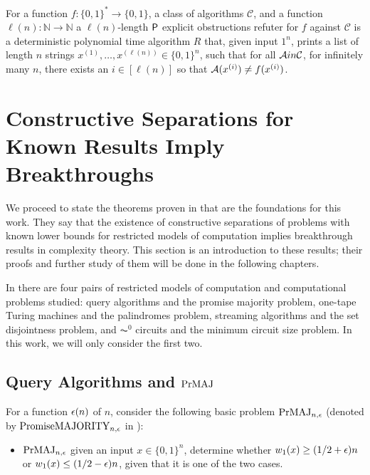 \begin{definition}
	For a function $f \colon \{0, 1\}^* \to \{0, 1\}$, a class of algorithms $\mathcal{C}$,
	and a function $\ell(n) \colon \mathbb{N} \to \mathbb{N}$ 
	a $\ell(n)$-length $\mathsf{P}$ explicit obstructions refuter for $f$ against $\mathcal{C}$ is a deterministic polynomial time
	algorithm $R$ that, given input $1^n$, prints a list of length $n$ strings
	$x^{(1)}, \ldots, x^{(\ell(n))} \in \{0, 1\}^n$,
	such that for all $\mathcal{A} in \mathcal{C}$, for infinitely many $n$, there exists an $i \in [\ell(n)]$ so that 
	$\mathcal{A}(x^{(i)}) \neq f(x^{(i)})$.
\end{definition}



\section{Constructive Separations for Known Results Imply Breakthroughs}

We proceed to state the 
theorems proven in \cite{ConstructiveSeparations} that are the foundations 
for this work. They say that the existence of constructive separations of problems 
with known lower bounds for restricted models of computation implies breakthrough results in complexity theory. 
This section is an introduction to these results; their proofs and further study of them will be 
done in the following chapters. 

In \cite{ConstructiveSeparations} there are four pairs of restricted models of computation
and computational problems studied: query algorithms and the promise majority problem,
one-tape Turing machines and the palindromes problem, streaming algorithms and the set disjointness problem,
and $\AC^0$ circuits and the minimum circuit size problem. In this work, we will only consider the first two. 

\subsection{Query Algorithms and $\mathrm{PrMAJ}$}

For a function $\epsilon(n)$ of $n$, consider the following basic problem $\mathrm{PrMAJ}_{n, \epsilon}$ (denoted 
by $\textrm{PromiseMAJORITY}_{n, \epsilon}$ in \cite{ConstructiveSeparations}):

\begin{itemize}
	\item[] $\mathrm{PrMAJ}_{n, \epsilon}$ given an input $x \in \{0, 1\}^n$, determine whether $w_1(x) \geq (1/2+\epsilon)n$
	or $w_1(x) \leq (1/2-\epsilon)n$, given that it is one of the two cases. 
\end{itemize}


